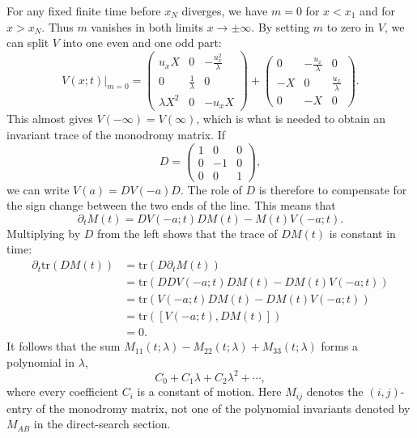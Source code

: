 \documentclass[english,master]{liumaiex}
\theoremstyle{thesisplain}
\theoremstyle{thesisdefinition}
\newcommand{\tr}{\text{tr}}
\numberwithin{equation}{section}
\begin{document}
For any fixed finite time before $x_N$ diverges, we have $m=0$ for $x<x_1$
and for $x>x_N$. Thus $m$ vanishes in both limits $x \rightarrow \pm \infty$. By setting $m$ to zero in $V$, we can split $V$ into one even and one odd part:
\begin{equation}
	V(x;t)\big|_{m=0} =
\begin{pmatrix}
	u_x X & 0 & -\frac{u_x^2}{\lambda} \\
	0 & \frac{1}{\lambda} & 0 \\
	\lambda X^2 & 0 & -u_x X
\end{pmatrix} +
\begin{pmatrix}
	0  & -\frac{u_x}{\lambda} & 0 \\
	-X & 0 & \frac{u_x}{\lambda} \\
	0 & -X & 0
\end{pmatrix}.
\end{equation}
This almost gives $V(-\infty) = V(\infty)$, which is what is needed to obtain an invariant trace of the monodromy matrix. If
\begin{equation}
	D = 
\begin{pmatrix}
	1 & 0 & 0 \\
	0 & -1 & 0 \\
	0 & 0 & 1
\end{pmatrix},
\end{equation}
%
we can write $V(a) = DV(-a)D$. The role of $D$ is therefore to compensate for the sign change between the two ends of the line. This means that
\begin{equation}
	\partial_t M(t) = DV(-a;t)DM(t) - M(t)V(-a;t).
\end{equation}
Multiplying by $D$ from the left shows that the trace of $DM(t)$ is constant in time:
\begin{equation}
\begin{aligned}
	\partial_t \tr(D M(t))
	&= \tr(D \partial_t M(t)) \\
	&= \tr(DDV(-a;t)DM(t) - DM(t)V(-a;t)) \\
	&= \tr(V(-a;t)DM(t) - DM(t)V(-a;t)) \\
	&= \tr([V(-a;t), DM(t)]) \\
	&= 0.
\end{aligned}
\end{equation}
It follows that the sum $M_{11}(t;\lambda) - M_{22}(t;\lambda) + M_{33}(t;\lambda)$ forms a polynomial in $\lambda$,
\begin{equation}
	C_0 + C_1 \lambda + C_2 \lambda^2 + \cdots,
\end{equation}
where every coefficient $C_i$ is a constant of motion. Here $M_{ij}$ denotes the $(i,j)$-entry of the monodromy matrix, not one of the polynomial invariants denoted by $M_{AB}$ in the direct-search section.
\end{document}
